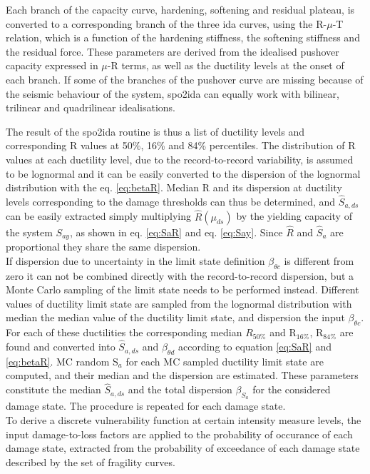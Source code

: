 Each branch of the capacity curve, hardening, softening and residual plateau, is converted to a corresponding branch of the three ida curves, using the R-$\mu$-T relation, which is a function of the hardening stiffness, the softening stiffness and the residual force. These parameters are derived from the idealised pushover capacity expressed in $\mu$-R terms, as well as the ductility levels at the onset of each branch. If some of the branches of the pushover curve are missing because of the seismic behaviour of the system, spo2ida can equally work with bilinear, trilinear and quadrilinear idealisations.

The result of the spo2ida routine is thus a list of ductility levels and corresponding R values at 50\%, 16\% and 84\% percentiles. The distribution of R values at each ductility level, due to the record-to-record variability, is assumed to be lognormal and it can be easily converted to the dispersion of the lognormal distribution with the eq. \ref{eq:betaR}. 
Median R and its dispersion at ductility levels corresponding to the damage thresholds can thus be determined, and $\hat{S}_{a,ds}$ can be easily extracted simply multiplying $\hat{R}(\mu_{ds})$ by the yielding capacity of the system $S_{ay}$, as shown in eq. \ref{eq:SaR} and eq. \ref{eq:Say}. Since $\hat{R}$ and $\hat{S}_{a}$ are proportional they share the same dispersion.\\

If dispersion due to uncertainty in the limit state definition $\beta_{\theta c}$ is different from zero it can not be combined directly with the record-to-record dispersion, but a Monte Carlo sampling of the limit state needs to be performed instead. Different values of ductility limit state are sampled from the  lognormal distribution with median the median value of the ductility limit state, and dispersion the input $\beta_{\theta c}$. For each of these ductilities the corresponding median $R_{50\%}$ and R$_{16\%}$, R$_{84\%}$ are found and converted into $\hat{S}_{a,ds}$ and $\beta_{\theta d}$ according to equation \ref{eq:SaR} and \ref{eq:betaR}. MC random S$_a$ for each MC sampled ductility limit state are computed, and their median and the dispersion are estimated. These parameters constitute the median $\hat{S}_{a,ds}$ and the total dispersion $\beta_{S_a}$ for the considered damage state. The procedure is repeated for each damage state.\\

To derive a discrete vulnerability function at certain intensity measure levels, the input damage-to-loss factors are applied to the probability of occurance of each damage state, extracted from the probability of exceedance of each damage state described by the set of fragility curves. 


